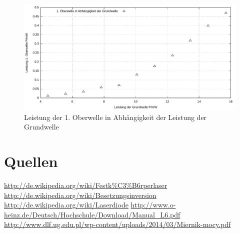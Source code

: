 \documentclass[numbers=noenddot,12pt,a4paper]{scrartcl}
\begin{document}
\begin{figure}[H]
 	\centering
 	\includegraphics[width=\textwidth]{messwerte/lasergreun.pdf}
 	\caption{Leistung der 1. Oberwelle in Abhängigkeit der Leistung der Grundwelle}\label{img:oberwelle}
\end{figure}
\pagebreak
\section{Quellen}
	\url{http://de.wikipedia.org/wiki/Festk%C3%B6rperlaser}\newline\newline
	\url{http://de.wikipedia.org/wiki/Besetzungsinversion}\newline\newline
	\url{http://de.wikipedia.org/wiki/Laserdiode}\newline\newline
	\url{http://www.o-heinz.de/Deutsch/Hochschule/Download/Manual_L6.pdf}\newline\newline
	\url{http://www.dlf.ug.edu.pl/wp-content/uploads/2014/03/Miernik-mocy.pdf}\newline\newline
\end{document}

